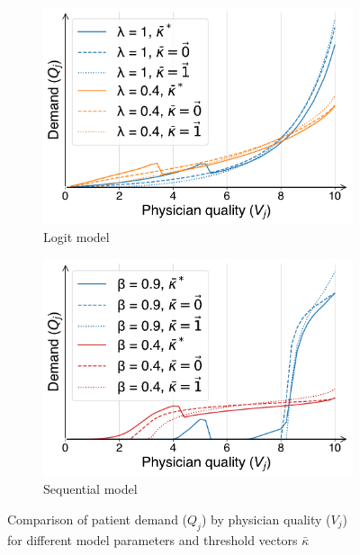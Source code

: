 \documentclass[../main.tex]{subfiles}
\begin{document}
\vspace{-0.25cm}

\begin{figure}[H]
    \centering
    \begin{subfigure}[b]{0.46\linewidth}
        \centering
        \includegraphics[width=\linewidth]{Q_comparison.pdf}
        \vspace{-0.6cm}
        \caption{Logit model}
        \label{fig:logit_Q_comp}
    \end{subfigure}
    \hspace{0.05\linewidth}  %
    \begin{subfigure}[b]{0.46\linewidth}
        \centering
        \includegraphics[width=\linewidth]{schnell_Q_comparison.pdf}
        \vspace{-0.6cm}
        \caption{Sequential model}
        \label{fig:schnell_Q_comp}
    \end{subfigure}
    \caption{Comparison of patient demand ($Q_j$) by physician quality ($V_j$)\\ for different model parameters and threshold vectors $\bar{\kappa}$}
    \label{fig:Q_comparison}
\end{figure}
\end{document}
